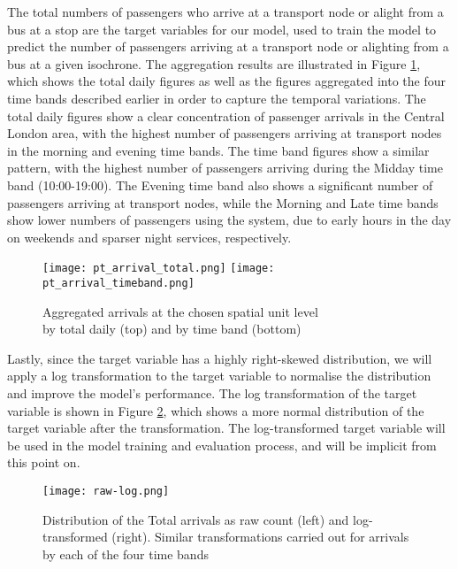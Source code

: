 The total numbers of passengers who arrive at a transport node or alight from a bus at a stop are the target variables for our model, used to train the model to predict the number of passengers arriving at a transport node or alighting from a bus at a given isochrone. 
The aggregation results are illustrated in Figure \ref{fig:ptarrival}, which shows the total daily figures as well as the figures aggregated into the four time bands described earlier in order to capture the temporal variations. The total daily figures show a clear concentration of passenger arrivals in the Central London area, with the highest number of passengers arriving at transport nodes in the morning and evening time bands. The time band figures show a similar pattern, with the highest number of passengers arriving during the Midday time band (10:00-19:00). The Evening time band also shows a significant number of passengers arriving at transport nodes, while the Morning and Late time bands show lower numbers of passengers using the system, due to early hours in the day on weekends and sparser night services, respectively.

\begin{figure}[!b]
    \centering
    \texttt{[image: pt\_arrival\_total.png]}
    \centering
    \texttt{[image: pt\_arrival\_timeband.png]}
    \captionsetup{justification=centering}
    \caption{Aggregated arrivals at the chosen spatial unit level\\ by total daily (top) and by time band (bottom)}
    \label{fig:ptarrival}
\end{figure}

Lastly, since the target variable has a highly right-skewed distribution, we will apply a log transformation to the target variable to normalise the distribution and improve the model's performance. The log transformation of the target variable is shown in Figure \ref{fig:rawlog}, which shows a more normal distribution of the target variable after the transformation. The log-transformed target variable will be used in the model training and evaluation process, and will be implicit from this point on.

\begin{figure}[!ht]
    \centering
    \texttt{[image: raw-log.png]}
    \captionsetup{justification=centering}
    \caption{Distribution of the Total arrivals as raw count (left) and log-transformed (right). Similar transformations carried out for arrivals by each of the four time bands}
    \label{fig:rawlog}
\end{figure}

